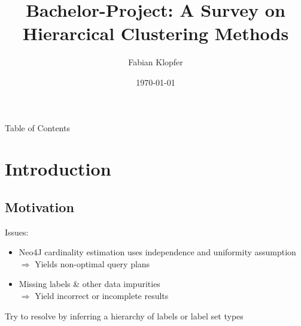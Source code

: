 \documentclass[rgb]{beamer}
\begin{document}
\setmainfont{Arial}
\setsansfont{Arial}


\title{Bachelor-Project: A Survey on Hierarcical Clustering Methods}
\author{Fabian Klopfer} 
\date{\today}

\begin{frame}
	\titlepage
\end{frame}

\begin{frame}[t]{Table of Contents}
	\tableofcontents
\end{frame}

\section{Introduction}

    \subsection{Motivation}
        \begin{frame}[t]
        \subsectionpage
        Issues:
            \begin{itemize}
                \item Neo4J cardinality estimation uses independence and uniformity assumption \\
                    $\Rightarrow$ Yields non-optimal query plans
                \item Missing labels \& other data impurities \\
                    $\Rightarrow$ Yield incorrect or incomplete results
            \end{itemize}{}
            \vspace{1cm}
        Try to resolve by inferring a hierarchy of labels or label set types \\
        \end{frame}
        
\end{document}
